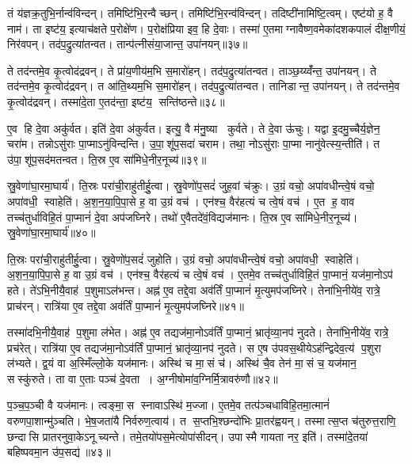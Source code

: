 तं य॑ज्ञक्र॒तुभि॒र्नान्व॑विन्दन्।
तमिष्टि॑भि॒रन्वैच्छन्।
तमिष्टि॑भि॒रन्व॑विन्दन्।
तदिष्टी॑नामिष्टि॒त्वम्।
एष्ट॑यो ह॒ वै नाम॑।
ता इष्ट॑य॒ इत्याच॑क्षते प॒रोक्षे॑ण।
प॒रोक्ष॑प्रिया इव॒ हि दे॒वाः।
तस्मा॑ ए॒तमाग्नावैष्ण॒वमेका॑दशकपालं दीक्ष॒णीयं॒ निर॑वपन्।
तद॑प॒द्रुत्या॑तन्वत।
तान्प॑त्नीसंया॒जान्त॒ उपा॑नयन्॥३७॥

ते तद॑न्तमे॒व कृ॒त्वोद॑द्रवन्।
ते प्रा॑य॒णीय॑म॒भि स॒मारो॑हन्।
तद॑प॒द्रुत्या॑तन्वत।
ताञ्छ॒य्य्वँ॑न्त॒ उपा॑नयन्।
ते तद॑न्तमे॒व कृ॒त्वोद॑द्रवन्।
त आ॑ति॒थ्यम॒भि स॒मारो॑हन्।
तद॑प॒द्रुत्या॑तन्वत।
तानिडान्त॒ उपा॑नयन्।
ते तद॑न्तमे॒व कृ॒त्वोद॑द्रवन्।
तस्मा॑दे॒ता ए॒तद॑न्ता॒ इष्ट॑य॒ सन्ति॑ष्ठन्ते॥३८॥

ए॒व हि दे॒वा अकु॑र्वत।
इति॑ दे॒वा अ॑कुर्वत।
इत्यु॒ वै म॑नु॒ष्या कुर्वते।
ते दे॒वा ऊ॑चुः।
यद्वा इ॒दमु॒च्चैर्य॒ज्ञेन॒ चरा॑म।
तन्नोऽसु॑राः पा॒प्माऽनु॑विन्दन्ति।
उ॒पा॒शू॑प॒सदा॑ चराम।
तथा॒ नोऽसु॑राः पा॒प्मा नानु॑वेत्स्य॒न्तीति॑।
त उ॑पा॒शू॑प॒सद॑मतन्वत।
ति॒स्र ए॒व सा॑मिधे॒नीर॒नूच्य॑॥३९॥

स्रु॒वेणा॑घा॒रमा॒घार्य॑।
ति॒स्रः परा॑ची॒राहु॑तीर्\mbox{}हु॒त्वा।
स्रु॒वेणो॑प॒सदं॑ जुह॒वां च॑क्रुः।
उ॒ग्रं वचो॒ अपा॑वधीन्त्वे॒षं वचो॒ अपा॑वधी॒ स्वाहेति॑।
अ॒श॒न॒या॒पि॒पा॒से ह॒ वा उ॒ग्रं वच॑।
एन॑श्च॒ वैर॑हत्यं च त्वे॒षं वच॑।
ए॒त ह॒ वाव तच्च॑तुर्धाविहि॒तं पा॒प्मानं॑ दे॒वा अप॑जघ्निरे।
तथो॑ ए॒वैतदे॑वं॒विद्यज॑मानः।
ति॒स्र ए॒व सा॑मिधे॒नीर॒नूच्य॑।
स्रु॒वेणा॑घा॒रमा॒घार्य॑॥४०॥

ति॒स्रः परा॑ची॒राहु॑तीर्\mbox{}हु॒त्वा।
स्रु॒वेणो॑प॒सदं॑ जुहोति।
उ॒ग्रं वचो॒ अपा॑वधीन्त्वे॒षं वचो॒ अपा॑वधी॒ स्वाहेति॑।
अ॒श॒न॒या॒पि॒पा॒से ह॒ वा उ॒ग्रं वच॑।
एन॑श्च॒ वैर॑हत्यं च त्वे॒षं वच॑।
ए॒तमे॒व तच्च॑तुर्धाविहि॒तं पा॒प्मानं॒ यज॑मा॒नोऽप॑ हते।
ते॑ऽभि॒नीयै॒वाह॑ प॒शुमाऽल॑भन्त।
अह्न॑ ए॒व तद्दे॒वा अव॑र्तिं पा॒प्मानं॑ मृ॒त्युमप॑जघ्निरे।
तेना॑भि॒नीये॑व॒ रात्रे॒ प्राच॑रन्।
रात्रि॑या ए॒व तद्दे॒वा अव॑र्तिं पा॒प्मानं॑ मृ॒त्युमप॑जघ्निरे॥४१॥

तस्मा॑दभि॒नीयै॒वाह॑ प॒शुमा ल॑भेत।
अह्न॑ ए॒व तद्यज॑मा॒नो\-ऽव॑र्तिं पा॒प्मानं॒ भ्रातृ॑व्या॒नप॑ नुदते।
तेना॑भि॒नीये॑व॒ रात्रे॒ प्रच॑रेत्।
रात्रि॑या ए॒व तद्यज॑मा॒नोऽव॑र्तिं पा॒प्मानं॒ भ्रातृ॑व्या॒नप॑ नुदते।
स ए॒ष उ॑पवस॒थीयेऽह॑न्द्विदेव॒त्य॑ प॒शुरा ल॑भ्यते।
द्व॒यं वा अ॒स्मिँल्लो॒के यज॑मानः।
अस्थि॑ च मा॒सं च॑।
अस्थि॑ चै॒व तेन॑ मा॒सं च॒ यज॑मान॒ सस्कु॑रुते।
ता वा ए॒ताः पञ्च॑ दे॒वता।
अ॒ग्नीषोमा॑व॒ग्निर्मि॒त्रावरु॑णौ॥४२॥

प॒ञ्च॒प॒ञ्ची वै यज॑मानः।
त्वङ्मा॒स स्नावाऽस्थि॑ म॒ज्जा।
ए॒तमे॒व तत्प॑ञ्चधाविहि॒तमा॒त्मानं॑ वरुणपा॒शान्मु॑ञ्चति।
भे॒ष॒जता॑यै निर्वरुण॒त्वाय॑।
त स॒प्तभि॒श्छन्दो॑भिः प्रा॒तर॑ह्वयन्।
तस्मात्स॒प्त च॑तुरुत्त॒राणि॒ छन्दासि प्रातरनुवा॒केऽनूच्यन्ते।
तमे॒तयो॑पस॒मेत्योपा॑सीदन्।
उपास्मै गायता नर॒ इति॑।
तस्मा॑दे॒तया॑ बहिष्पवमा॒न उ॑प॒सद्य॑॥४३॥\anuvakamend[ऐ॒च्छ॒न्न॒न॒य॒स्ति॒ष्ठ॒न्ते॒ऽनूच्या॒नूच्य॑ स्रु॒वेणा॑घा॒रमा॒घार्य॒ रात्रि॑या ए॒व तद्दे॒वा अव॑र्तिं पा॒प्मानं॑ मृ॒त्युमप॑जघ्निरे मि॒त्रावरु॑णौ॒ नव॑ च (दे॒वा यज॑मानो दे॒वा दे॒वा यज॑मानो॒ यज॑मान॒ प्राच॑रं॒ प्रच॑रे॒दाल॑भ॒न्ताल॑भेत मृ॒त्युमप॑जघ्निरे॒ भ्रातृ॑व्यान्॥)]

